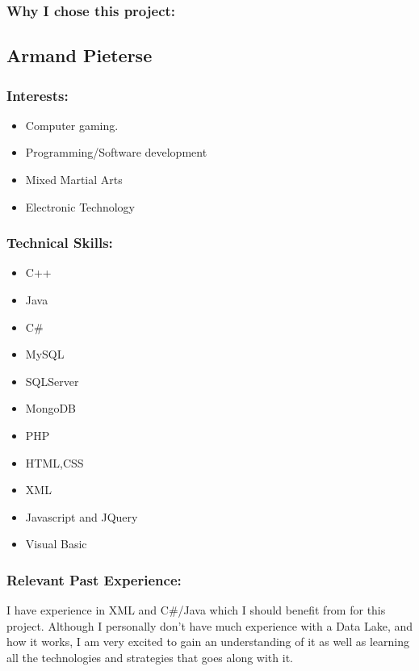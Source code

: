 \subsubsection{Why I chose this project:}

\newpage
\subsection{Armand Pieterse}
	
\subsubsection{Interests:}
	\begin{itemize}
		\item Computer gaming.
		\item Programming/Software development
		\item Mixed Martial Arts
		\item Electronic Technology
	\end{itemize}
		
\subsubsection{Technical Skills:}
	\begin{itemize}
		\item C++
		\item Java
		\item	C#
		\item	MySQL
		\item	SQLServer
		\item	MongoDB
		\item PHP
		\item HTML,CSS
		\item XML
		\item Javascript and JQuery
		\item Visual Basic 
	\end{itemize}

\subsubsection{Relevant Past Experience:}
	\par{I have experience in XML and C#/Java which I should benefit from for this project. Although I personally don't have much experience with a Data Lake, and how it works, I am very excited to gain an understanding of it as well as learning all the technologies and strategies that goes along with it.}

